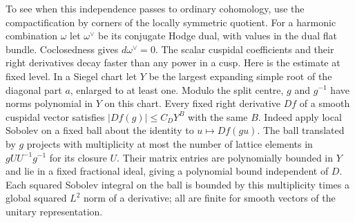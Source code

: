 \documentclass[11pt]{amsart}
\theoremstyle{definition}
\theoremstyle{remark}
\begin{document}
To see when this independence passes to ordinary cohomology, use the
compactification by corners of the locally symmetric quotient. For a
harmonic combination $\omega$ let $\omega^\vee$ be its conjugate
Hodge dual, with values in the dual flat bundle. Coclosedness gives
$d\omega^\vee=0$. The scalar cuspidal coefficients and their right derivatives decay
faster than any power in a cusp. Here is the estimate at fixed
level. In a Siegel chart let $Y$ be the largest expanding simple
root of the diagonal part $a$, enlarged to at least one. Modulo
the split centre, $g$ and $g^{-1}$ have norms polynomial in $Y$
on this chart. Every fixed right derivative $Df$ of a smooth
cuspidal vector satisfies $|Df(g)|\le C_DY^B$ with the same $B$.
Indeed apply local Sobolev on a fixed ball about the identity to
$u\mapsto Df(gu)$. The ball translated by $g$ projects with
multiplicity at most the number of lattice elements in $gUU^{-1}g^{-1}$
for its closure $U$. Their matrix entries are polynomially bounded
in $Y$ and lie in a fixed fractional ideal, giving a polynomial
bound independent of $D$. Each squared Sobolev integral on the ball
is bounded by this multiplicity times a global squared $L^2$ norm
of a derivative; all are finite for smooth vectors of the unitary
representation.
\end{document}
